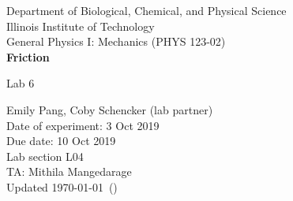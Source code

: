 \documentclass [12pt, letterpaper, twoside] {article}
\begin{document}
\begin {titlepage}
\begin {center}
Department of Biological, Chemical, and Physical Science\\
\vspace {0.1cm}
Illinois Institute of Technology\\
\vspace {0.1cm}
General Physics I: Mechanics (PHYS 123-02)\\
\vspace* {\fill}
\begingroup
\Large
\textbf {Friction}
\vspace {0.35cm}

\normalsize
Lab 6
\vspace {1.5cm}
\endgroup
\vspace* {\fill}
\end {center}

\vspace*{\fill}
\begin {flushright}
\footnotesize
Emily Pang, Coby Schencker (lab partner)\\
Date of experiment: 3 Oct 2019\\
Due date: 10 Oct 2019\\
Lab section L04\\
TA: Mithila Mangedarage\\
Updated \usdate\today~(\currenttime)
\end {flushright}
\end {titlepage}
\end{document}
